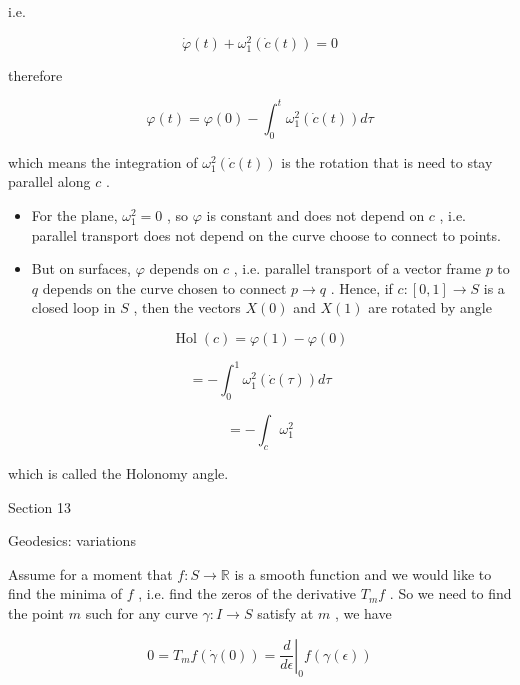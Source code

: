 \documentclass[lang=cn,a4paper,11pt,openany,twoside]{elegantbook}
\begin{document}
i.e.

\[
\dot{\varphi }\left( t\right)  + {\omega }_{1}^{2}\left( {\dot{c}\left( t\right) }\right)  = 0
\]

therefore

\[
\varphi \left( t\right)  = \varphi \left( 0\right)  - {\int }_{0}^{t}{\omega }_{1}^{2}\left( {\dot{c}\left( t\right) }\right) {d\tau }
\]

which means the integration of \({\omega }_{1}^{2}\left( {\dot{c}\left( t\right) }\right)\) is the rotation that is need to stay parallel along \(c\) .

\begin{itemize}\relax
\item\relax For the plane, \({\omega }_{1}^{2} = 0\) , so \(\varphi\) is constant and does not depend on \(c\) , i.e. parallel transport does not depend on the curve choose to connect to points.
\end{itemize}

\begin{itemize}\relax
\item\relax But on surfaces, \(\varphi\) depends on \(c\) , i.e. parallel transport of a vector frame \(p\) to \(q\) depends on the curve chosen to connect \(p \rightarrow  q\) . Hence, if \(c : \left\lbrack  {0,1}\right\rbrack   \rightarrow  S\) is a closed loop in \(S\) , then the vectors \(X\left( 0\right)\) and \(X\left( 1\right)\) are rotated by angle
\end{itemize}

\[
\operatorname{Hol}\left( c\right)  = \varphi \left( 1\right)  - \varphi \left( 0\right)
\]

\[
=  - {\int }_{0}^{1}{\omega }_{1}^{2}\left( {\dot{c}\left( \tau \right) }\right) {d\tau }
\]

\[
=  - {\int }_{c}{\omega }_{1}^{2}
\]

which is called the Holonomy angle.

Section 13

Geodesics: variations

Assume for a moment that \(f : S \rightarrow  \mathbb{R}\) is a smooth function and we would like to find the minima of \(f\) , i.e. find the zeros of the derivative \({T}_{m}f\) . So we need to find the point \(m\) such for any curve \(\gamma  : I \rightarrow  S\) satisfy at \(m\) , we have

\[
0 = {T}_{m}f\left( {\dot{\gamma }\left( 0\right) }\right)  = {\left. \frac{d}{d\epsilon }\right| }_{0}f\left( {\gamma \left( \epsilon \right) }\right)
\]
\end{document}
